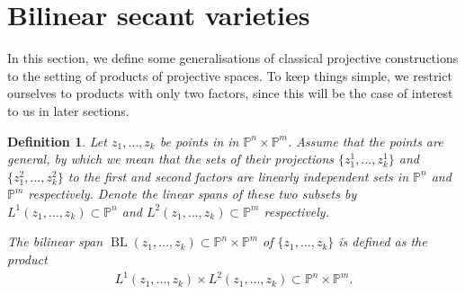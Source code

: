 \documentclass[a4paper,11pt]{article}
\newtheorem{definition}[theorem]{Definition}
\newcommand{\PP}{\mathbb P}
\newcommand{\BL}{\operatorname{BL}}
\begin{document}
\section{Bilinear secant varieties}\label{section-bilinear}
In this section, we define some generalisations of classical projective constructions to the setting of products of projective spaces. To keep things simple, we restrict ourselves to products with only two factors, since this will be the case of interest to us in later sections.

  \begin{definition}\label{definition-bilinearspan}
    Let $z_1,\ldots,z_k$ be points in in $\PP^n \times \PP^m$. Assume that the points are \emph{general}, by which we mean that the sets of their projections $\{z^1_1,\dots,z^1_k\}$ and $\{z^2_1,\dots,z^2_k\}$ to the first and second factors are linearly independent sets in $\PP^n$ and $\PP^m$ respectively.  Denote the linear spans of these two subsets by $L^1(z_1,\ldots,z_k) \subset \PP^n$ and $L^2(z_1,\ldots,z_k) \subset \PP^m$ respectively.

    The \emph{bilinear span} $\BL(z_1,\ldots,z_k) \subset \PP^n \times \PP^m$ of  $\{z_1,\ldots,z_k\}$ is defined as the product
    \begin{align*}
      L^1(z_1,\ldots,z_k) \times L^2(z_1,\ldots,z_k) \subset \PP^n \times \PP^m.
    \end{align*}
  \end{definition}
  
\end{document}
